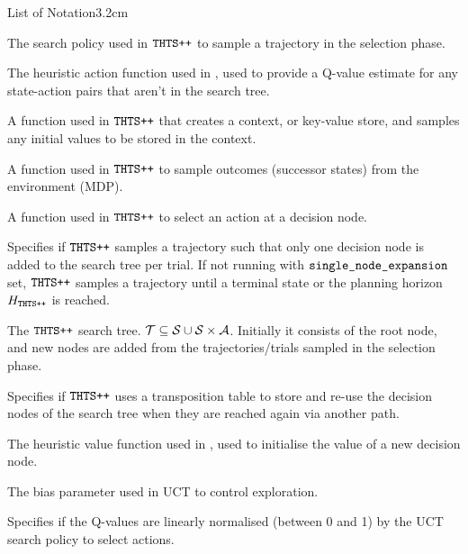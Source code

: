 \begin{mclistof}{List of Notation}{3.2cm}
    \item[$\pisearch$]
        The search policy used in ${\textnormal{\texttt{THTS++}}}$ to sample a trajectory in the selection phase.
    \item[$\Qinit$]
        The heuristic action function used in \thtspp, used to provide a Q-value estimate for any state-action pairs that aren't in the search tree.
    \item[$\samplecontext$]
        A function used in ${\textnormal{\texttt{THTS++}}}$ that creates a context, or key-value store, and samples any initial values to be stored in the context.
    \item[$\sampleoutcome$]
        A function used in ${\textnormal{\texttt{THTS++}}}$ to sample outcomes (successor states) from the environment (MDP).
    \item[$\selectaction$]
        A function used in ${\textnormal{\texttt{THTS++}}}$ to select an action at a decision node.
    \item[\mctsmode] %
        \hspace{1.35cm} Specifies if ${\textnormal{\texttt{THTS++}}}$ samples a trajectory such that only one decision node is added to the search tree per trial. If not running with ${\textnormal{\texttt{single\_node\_expansion}}}$ set, ${\textnormal{\texttt{THTS++}}}$ samples a trajectory until a terminal state or the planning horizon $H_{{\textnormal{\texttt{THTS++}}}}$ is reached.
    \item[$\cl{T}$] 
        The ${\textnormal{\texttt{THTS++}}}$ search tree. $\mathcal{T}\subseteq \mathcal{S} \cup \mathcal{S}\times\mathcal{A}$. Initially it consists of the root node, and new nodes are added from the trajectories/trials sampled in the selection phase.
    \item[\graphmode] %
        \hspace{1cm} Specifies if ${\textnormal{\texttt{THTS++}}}$ uses a transposition table to store and re-use the decision nodes of the search tree when they are reached again via another path.
    \item[$\Vinit$]
        The heuristic value function used in \thtspp, used to initialise the value of a new decision node.  %
    \\
    \item[$\buct$]
        The bias parameter used in UCT to control exploration.
    \item[$\normalisedq$]
        Specifies if the Q-values are linearly normalised (between 0 and 1) by the UCT search policy to select actions.
    \item[$\pirollout$] 

\end{mclistof}
